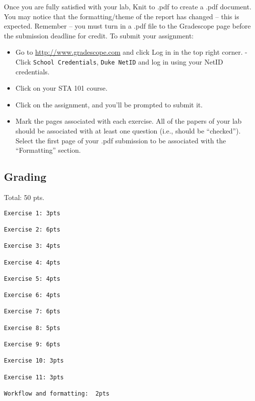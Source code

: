 \documentclass[
]{article}
\begin{document}
Once you are fully satisfied with your lab, Knit to .pdf to create a
.pdf document. You may notice that the formatting/theme of the report
has changed -- this is expected. Remember -- you must turn in a .pdf
file to the Gradescope page before the submission deadline for credit.
To submit your assignment:

\begin{itemize}
\item
  Go to \url{http://www.gradescope.com} and click Log in in the top
  right corner. - Click \texttt{School\ Credentials},
  \texttt{Duke\ NetID} and log in using your NetID credentials.
\item
  Click on your STA 101 course.
\item
  Click on the assignment, and you'll be prompted to submit it.
\item
  Mark the pages associated with each exercise. All of the papers of
  your lab should be associated with at least one question (i.e., should
  be ``checked''). Select the first page of your .pdf submission to be
  associated with the ``Formatting'' section.
\end{itemize}

\hypertarget{grading}{%
\subsection{Grading}\label{grading}}

Total: 50 pts.

\begin{verbatim}
Exercise 1: 3pts

Exercise 2: 6pts

Exercise 3: 4pts

Exercise 4: 4pts

Exercise 5: 4pts

Exercise 6: 4pts

Exercise 7: 6pts

Exercise 8: 5pts

Exercise 9: 6pts

Exercise 10: 3pts

Exercise 11: 3pts

Workflow and formatting:  2pts
\end{verbatim}
\end{document}
